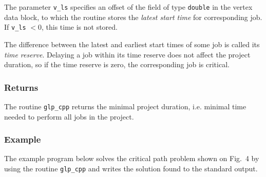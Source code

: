\documentclass[dvipdfm,11pt]{report}
\begin{document}
The parameter \verb|v_ls| specifies an offset of the field of type
\verb|double| in the vertex data block, to which the routine stores
the {\it latest start time} for corresponding job. If \verb|v_ls|
$<0$, this time is not stored.

The difference between the latest and earliest start times of some job
is called its {\it time reserve}. Delaying a job within its time reserve
does not affect the project duration, so if the time reserve is zero,
the corresponding job is critical.

\subsubsection{Returns}

The routine \verb|glp_cpp| returns the minimal project duration, i.e.
minimal time needed to perform all jobs in the project.

\subsubsection{Example}

The example program below solves the critical path problem shown on
Fig.~4 by using the routine \verb|glp_cpp| and writes the solution found
to the standard output.
\end{document}
